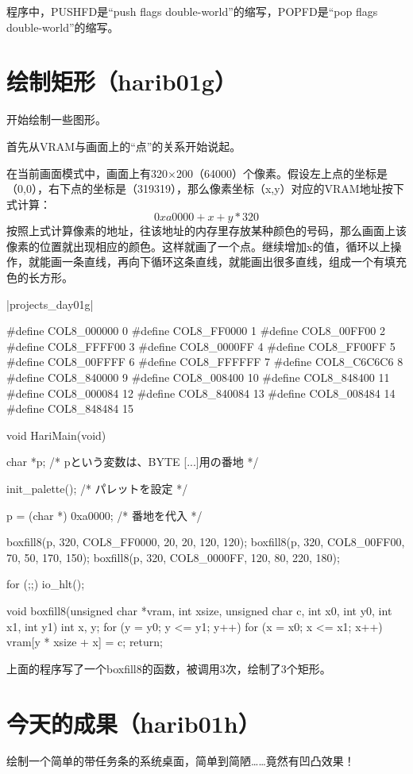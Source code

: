 程序中，PUSHFD是“push flags double-world”的缩写，POPFD是“pop flags double-world”的缩写。
\section{	绘制矩形（harib01g）	}
开始绘制一些图形。

首先从VRAM与画面上的“点”的关系开始说起。

在当前画面模式中，画面上有320$\times$200（64000）个像素。假设左上点的坐标是（0,0），右下点的坐标是（319319），那么像素坐标（x,y）对应的VRAM地址按下式计算：
\begin{equation*}
  0xa0000+x+y*320
\end{equation*}
按照上式计算像素的地址，往该地址的内存里存放某种颜色的号码，那么画面上该像素的位置就出现相应的颜色。这样就画了一个点。继续增加x的值，循环以上操作，就能画一条直线，再向下循环这条直线，就能画出很多直线，组成一个有填充色的长方形。

\dag|projects_day\harib01g|
\begin{code}[label=bootpack.c]
#define COL8_000000		0
#define COL8_FF0000		1
#define COL8_00FF00		2
#define COL8_FFFF00		3
#define COL8_0000FF		4
#define COL8_FF00FF		5
#define COL8_00FFFF		6
#define COL8_FFFFFF		7
#define COL8_C6C6C6		8
#define COL8_840000		9
#define COL8_008400		10
#define COL8_848400		11
#define COL8_000084		12
#define COL8_840084		13
#define COL8_008484		14
#define COL8_848484		15

void HariMain(void)
{
	char *p; /* pという変数は、BYTE [...]用の番地 */

	init_palette(); /* パレットを設定 */

	p = (char *) 0xa0000; /* 番地を代入 */

	boxfill8(p, 320, COL8_FF0000,  20,  20, 120, 120);
	boxfill8(p, 320, COL8_00FF00,  70,  50, 170, 150);
	boxfill8(p, 320, COL8_0000FF, 120,  80, 220, 180);

	for (;;) {
		io_hlt();
	}
}

void boxfill8(unsigned char *vram, int xsize, unsigned char c, int x0, int y0, int x1, int y1)
{
	int x, y;
	for (y = y0; y <= y1; y++) {
		for (x = x0; x <= x1; x++)
			vram[y * xsize + x] = c;
	}
	return;
}
\end{code}

上面的程序写了一个boxfill8的函数，被调用3次，绘制了3个矩形。
\section{	今天的成果（harib01h）	}
绘制一个简单的带任务条的系统桌面，简单到简陋……竟然有凹凸效果！

